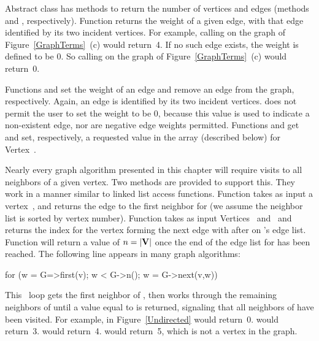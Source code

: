 Abstract class 
has methods to return the number of vertices and edges
(methods  and , respectively).
Function  returns the weight of a given edge, with that
edge identified by its two incident vertices.
For example, calling  on the graph of
Figure~\ref{GraphTerms}~(c) would return~4.
If no such edge exists, the weight is defined to be 0.
So calling  on the graph of
Figure~\ref{GraphTerms}~(c) would return~0.

Functions  and  set the weight of an edge
and remove an edge from the graph, respectively.
Again, an edge is identified by its two incident vertices.
 does not permit the user to set the weight to be 0,
because this value is used to indicate a non-existent edge, nor are
negative edge weights permitted.
Functions  and  get and set, respectively,
a requested value in the  array (described below) for
Vertex~.

Nearly every graph algorithm presented in this chapter will require
visits to all neighbors of a given vertex.
Two methods are provided to support this.
They work in a manner similar to linked list access functions.
Function  takes as input a vertex~, and returns
the edge to the first neighbor for  (we assume the neighbor
list is sorted by vertex number).
Function  takes as input Vertices~ and~
and returns the index for the vertex forming the next edge with
 after  on 's edge list.
Function  will return a value of \(n = |{\textbf{V}}|\) once
the end of the edge list for  has been reached.
The following line appears in many graph algorithms:

\begin{progenv}
for (w = G=>first(v); w < G->n(); w = G->next(v,w))
\end{progenv}

\noindent This \Cfor\ loop gets the first neighbor of , then
works through the remaining neighbors of  until a value equal
to  is returned, signaling that all neighbors of 
have been visited.
For example,  in Figure~\ref{Undirected} would return~0.
 would return~3.
 would return~4.
 would return~5, which is not a vertex in the graph.

